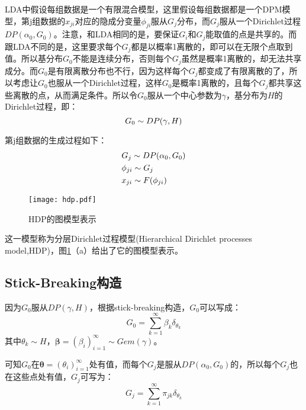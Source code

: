 LDA中假设每组数据是一个有限混合模型，这里假设每组数据都是一个DPM模型，第j组数据的$x_{ji}$对应的隐成分变量$\phi_{ji}$服从$G_j$分布，而$G_j$服从一个Dirichlet过程$DP(\alpha_0,G_0)$。注意，和LDA相同的是，要保证$G_i$和$G_j$能取值的点是共享的。而跟LDA不同的是，这里要求每个$G_j$都是以概率1离散的，即可以在无限个点取到值。所以基分布$G_0$不能是连续分布，否则每个$G_j$虽然是概率1离散的，却无法共享成分。而$G_0$是有限离散分布也不行，因为这样每个$G_j$都变成了有限离散的了，所以考虑让$G_0$也服从一个Dirichlet过程，这样$G_0$是概率1离散的，且每个$G_j$都共享这些离散的点，从而满足条件。所以令$G_0$服从一个中心参数为$\gamma$，基分布为$H$的Dirichlet过程，即：
\begin{equation}\vspace{-5pt}
G_0 \sim DP(\gamma,H)
\end{equation}

第j组数据的生成过程如下：
\begin{equation}\vspace{-5pt}
\begin{split}
& G_j \sim DP(\alpha_0,G_0)\\
& \phi_{ji} \sim G_j\\
& x_{ji} \sim F(\phi_{ji})
\end{split}
\end{equation}
\begin{figure}
\texttt{[image: hdp.pdf]} 
\caption{HDP的图模型表示} \label{fig:hdp}
\end{figure}

这一模型称为分层Dirichlet过程模型(Hierarchical Dirichlet processes model,HDP)\cite{TEH:06}，图\ref{fig:hdp}（a）给出了它的图模型表示。

\subsection{Stick-Breaking构造}

因为$G_0$服从$DP(\gamma,H)$，根据stick-breaking构造，$G_0$可以写成：
\begin{equation}
G_0 = \sum_{k=1}^{\infty}\beta_k\delta_{\theta_k}
\end{equation}
其中$\theta_k \sim H$，${\bm \beta} = {(\beta_i)}_{i=1}^\infty \sim Gem(\gamma)$。

可知$G_0$在${\bm \theta} = {(\theta_i)}_{i=1}^\infty$处有值，而每个$G_j$是服从$DP(\alpha_0,G_0)$的，所以每个$G_j$也在这些点处有值，$G_j$可写为：
\begin{equation}
G_j = \sum_{k=1}^{\infty}\pi_{jk}\delta_{\theta_k}
\end{equation}

